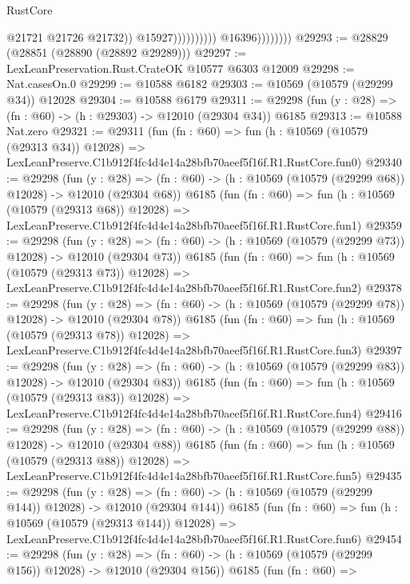 \begin{lexlean}{RustCore}
\begin{coremodule}
                                            @21721
                                            @21726
                                            @21732))
                                        @15927))))))))))
                    @16396))))))))
@29293 := @28829 (@28851 (@28890 (@28892 @29289)))
@29297 := LexLeanPreservation.Rust.CrateOK @10577 @6303 @12009
@29298 := Nat.casesOn.{0}
@29299 := @10588 @6182
@29303 := @10569 (@10579 (@29299 @34)) @12028
@29304 := @10588 @6179
@29311 := @29298 (fun (y : @28) => (fn : @60) -> (h : @29303) -> @12010 (@29304 @34)) @6185
@29313 := @10588 Nat.zero
@29321 := @29311
    (fun (fn : @60) =>
    fun (h : @10569 (@10579 (@29313 @34)) @12028) =>
    LexLeanPreserve.C1b912f4fc4d4e14a28bfb70aeef5f16f.R1.RustCore.fun0)
@29340 := @29298
    (fun (y : @28) =>
    (fn : @60) -> (h : @10569 (@10579 (@29299 @68)) @12028) -> @12010 (@29304 @68))
    @6185
    (fun (fn : @60) =>
    fun (h : @10569 (@10579 (@29313 @68)) @12028) =>
    LexLeanPreserve.C1b912f4fc4d4e14a28bfb70aeef5f16f.R1.RustCore.fun1)
@29359 := @29298
    (fun (y : @28) =>
    (fn : @60) -> (h : @10569 (@10579 (@29299 @73)) @12028) -> @12010 (@29304 @73))
    @6185
    (fun (fn : @60) =>
    fun (h : @10569 (@10579 (@29313 @73)) @12028) =>
    LexLeanPreserve.C1b912f4fc4d4e14a28bfb70aeef5f16f.R1.RustCore.fun2)
@29378 := @29298
    (fun (y : @28) =>
    (fn : @60) -> (h : @10569 (@10579 (@29299 @78)) @12028) -> @12010 (@29304 @78))
    @6185
    (fun (fn : @60) =>
    fun (h : @10569 (@10579 (@29313 @78)) @12028) =>
    LexLeanPreserve.C1b912f4fc4d4e14a28bfb70aeef5f16f.R1.RustCore.fun3)
@29397 := @29298
    (fun (y : @28) =>
    (fn : @60) -> (h : @10569 (@10579 (@29299 @83)) @12028) -> @12010 (@29304 @83))
    @6185
    (fun (fn : @60) =>
    fun (h : @10569 (@10579 (@29313 @83)) @12028) =>
    LexLeanPreserve.C1b912f4fc4d4e14a28bfb70aeef5f16f.R1.RustCore.fun4)
@29416 := @29298
    (fun (y : @28) =>
    (fn : @60) -> (h : @10569 (@10579 (@29299 @88)) @12028) -> @12010 (@29304 @88))
    @6185
    (fun (fn : @60) =>
    fun (h : @10569 (@10579 (@29313 @88)) @12028) =>
    LexLeanPreserve.C1b912f4fc4d4e14a28bfb70aeef5f16f.R1.RustCore.fun5)
@29435 := @29298
    (fun (y : @28) =>
    (fn : @60) -> (h : @10569 (@10579 (@29299 @144)) @12028) -> @12010 (@29304 @144))
    @6185
    (fun (fn : @60) =>
    fun (h : @10569 (@10579 (@29313 @144)) @12028) =>
    LexLeanPreserve.C1b912f4fc4d4e14a28bfb70aeef5f16f.R1.RustCore.fun6)
@29454 := @29298
    (fun (y : @28) =>
    (fn : @60) -> (h : @10569 (@10579 (@29299 @156)) @12028) -> @12010 (@29304 @156))
    @6185
    (fun (fn : @60) =>

\end{coremodule}
\end{lexlean}
